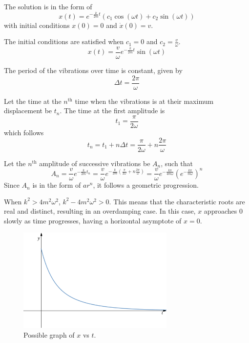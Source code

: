 \documentclass[a4paper]{article}
\begin{document}
The solution is in the form of
\begin{equation}
    x(t)=e^{-\frac k{2m}t}\left(c_1\cos(\omega t)+c_2\sin(\omega t)\right)
\end{equation}
with initial conditions \(x(0)=0\) and \(\dot x(0)=v\).

The initial conditions are satisfied when \(c_1=0\) and \(c_2=\frac v\omega\).
\begin{equation}
    \boxed{x(t)=\frac v\omega e^{-\frac k{2m}t}\sin(\omega t)}
\end{equation}

The period of the vibrations over time is constant, given by
\begin{equation}
    \Delta t=\frac{2\pi}\omega
\end{equation}

Let the time at the \(n^\text{th}\) time 
when the vibrations is at their maximum displacement be \(t_n\). 
The time at the first amplitude is
\begin{equation}
    t_1=\frac\pi{2\omega}
\end{equation}
which follows
\begin{equation}
    t_n=t_1+n\Delta t=\frac\pi{2\omega}+n\frac{2\pi}\omega
\end{equation}

Let the \(n^\text{th}\) amplitude of successive vibrations be \(A_n\), such that
\begin{equation}
    A_n=\frac v\omega e^{-\frac k{2m}t_n}
    =\frac v\omega e^{-\frac k{2m}\left(\frac\pi{2\omega}+n\frac{2\pi}\omega\right)}
    =\frac v\omega e^{-\frac{k\pi}{4m\omega}}\left(e^{-\frac{k\pi}{m\omega}}\right)^n
\end{equation}
Since \(A_n\) is in the form of \(ar^n\), it follows a geometric progression.

When \(k^2>4m^2\omega^2\), \(k^2-4m^2\omega^2>0\).
This means that the characteristic roots are real and distinct,
resulting in an overdamping case. In this case, \(x\) approaches 0 slowly as
time progresses, having a horizontal asymptote of \(x=0\).

\begin{figure}[ht]
    \centering
    \includegraphics[width=0.69\textwidth]{so9.png}
    \caption{Possible graph of \(x\) vs \(t\).}
\end{figure}
\end{document}
